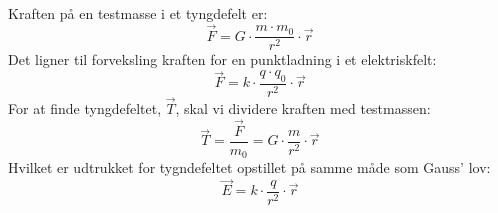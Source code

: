 Kraften på en testmasse i et tyngdefelt er:
\begin{equation}
	\vec{F} = G\cdot \frac{m \cdot m_0}{r^2} \cdot \vec{r}
\end{equation}
Det ligner til forveksling kraften for en punktladning i et elektriskfelt:
\begin{equation}
	\vec{F} = k \cdot \frac{q \cdot q_0}{r^2} \cdot \vec{r}
\end{equation}
For at finde tyngdefeltet, $\vec{T}$, skal vi dividere kraften med testmassen:
\begin{equation}
	\vec{T} = \frac{\vec{F}}{m_0} = G \cdot \frac{m}{r^2} \cdot \vec{r}
\end{equation}
Hvilket er udtrukket for tygndefeltet opstillet på samme måde som Gauss' lov:
\begin{equation}
	\vec{E} = k \cdot \frac{q}{r^2} \cdot \vec{r}
\end{equation}